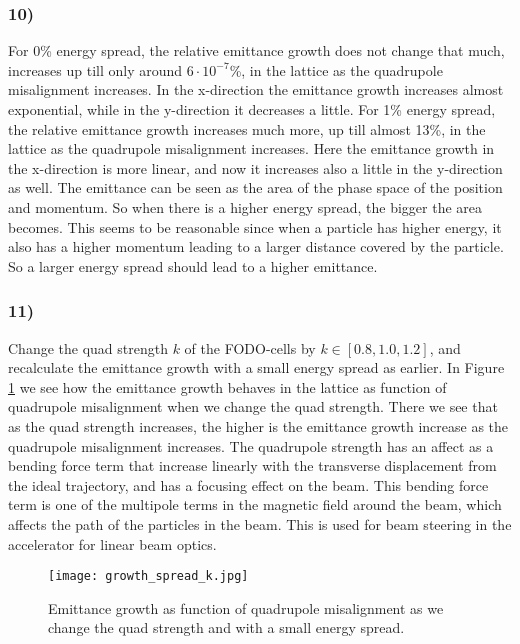 \documentclass[12pt,a4paper,english]{article}
\begin{document}
\subsubsection*{10)}
For 0\% energy spread, the relative emittance growth does not change that much, increases up till only around $6\cdot10^{-7}$\%, in the lattice as the quadrupole misalignment increases. In the x-direction the emittance growth increases almost exponential, while in the y-direction it decreases a little. For 1\% energy spread, the relative emittance growth increases much more, up till almost 13\%, in the lattice as the quadrupole misalignment increases. Here the emittance growth in the x-direction is more linear, and now it increases also a little in the y-direction as well. The emittance can be seen as the area of the phase space of the position and momentum. So when there is a higher energy spread, the bigger the area becomes. This seems to be reasonable since when a particle has higher energy, it also has a higher momentum leading to a larger distance covered by the particle. So a larger energy spread should lead to a higher emittance.	

\subsubsection*{11)}
Change the quad strength $k$ of the FODO-cells by $k\in[0.8,1.0,1.2]$, and recalculate the emittance growth with a small energy spread as earlier. In Figure \ref{fig:quad_strength} we see how the emittance growth behaves in the lattice as function of quadrupole misalignment when we change the quad strength. There we see that as the quad strength increases, the higher is the emittance growth increase as the quadrupole misalignment increases. The quadrupole strength has an affect as a bending force term that increase linearly with the transverse displacement from the ideal trajectory, and has a focusing effect on the beam. This bending force term is one of the multipole terms in the magnetic field around the beam, which affects the path of the particles in the beam. This is used for beam steering in the accelerator for linear beam optics.

\begin{figure}[htbp!]
	\centering\texttt{[image: growth\_spread\_k.jpg]}
	\caption{Emittance growth as function of quadrupole misalignment as we change the quad strength and with a small energy spread. \label{fig:quad_strength}}
\end{figure} 
\end{document}
